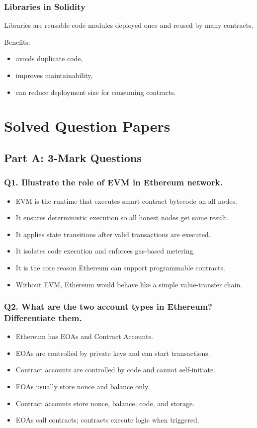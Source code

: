 \documentclass[12pt,a4paper]{article}
\begin{document}
\subsubsection*{Libraries in Solidity}
Libraries are reusable code modules deployed once and reused by many contracts.

Benefits:
\begin{itemize}
\item avoids duplicate code,
\item improves maintainability,
\item can reduce deployment size for consuming contracts.
\end{itemize}

\section{Solved Question Papers}

\subsection{Part A: 3-Mark Questions}

\subsubsection*{Q1. Illustrate the role of EVM in Ethereum network.}
\begin{itemize}
\item EVM is the runtime that executes smart contract bytecode on all nodes.
\item It ensures deterministic execution so all honest nodes get same result.
\item It applies state transitions after valid transactions are executed.
\item It isolates code execution and enforces gas-based metering.
\item It is the core reason Ethereum can support programmable contracts.
\item Without EVM, Ethereum would behave like a simple value-transfer chain.
\end{itemize}

\subsubsection*{Q2. What are the two account types in Ethereum? Differentiate them.}
\begin{itemize}
\item Ethereum has EOAs and Contract Accounts.
\item EOAs are controlled by private keys and can start transactions.
\item Contract accounts are controlled by code and cannot self-initiate.
\item EOAs usually store nonce and balance only.
\item Contract accounts store nonce, balance, code, and storage.
\item EOAs call contracts; contracts execute logic when triggered.
\end{itemize}
\end{document}
